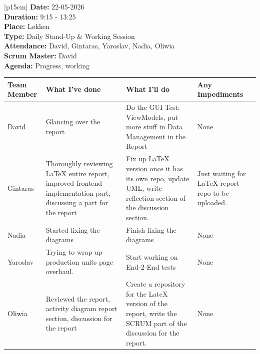 \begin{table}[H]
    \centering
    \begin{tabular}{|p{15cm}|}   
        \hline
        \textbf{Date:}  22-05-2026 \\
        \textbf{Duration:}  9:15 - 13:25 \\
        \textbf{Place:}  Løkken \\
        \textbf{Type:} Daily Stand-Up \& Working Session \\
        \textbf{Attendance:} David, Gintaras, Yaroslav, Nadia, Oliwia \\
        \textbf{Scrum Master:}  David \\
        \textbf{Agenda:} Progress, working
        \begin{table}[H]
            \begin{tabular}{|p{1.75cm}|p{4cm}|p{4cm}|p{4cm}|}
                \hline
                \cellcolor[HTML]{BFBFBF}  \textbf{Team Member} & \cellcolor[HTML]{BFBFBF}  \textbf{What I've done} & \cellcolor[HTML]{BFBFBF}  \textbf{What I'll do} & \cellcolor[HTML]{BFBFBF}  \textbf{Any Impediments}\\
                \hline
                \cellcolor[HTML]{d4d4d4} David & Glancing over the report & Do the GUI Test: ViewModels, put more stuff in Data Management in the Report & None \\
                \hline
                \cellcolor[HTML]{d4d4d4} Gintaras & Thoroughly reviewing LaTeX entire report, improved frontend implementation part, discussing a part for the report & Fix up LaTeX version once it has its own repo, update UML, write reflection section of the discussion section. & Just waiting for LaTeX report repo to be uploaded. \\
                \hline
                \cellcolor[HTML]{d4d4d4} Nadia & Started fixing the diagrams & Finish fixing the diagrams  & None \\
                \hline
                \cellcolor[HTML]{d4d4d4} Yaroslav & Trying to wrap up production units page overhaul. & Start working on End-2-End tests & None \\
                \hline
                \cellcolor[HTML]{d4d4d4} Oliwia & Reviewed the report, activity diagram report section, discussion for the report  & Create a repository for the LateX version of the report, write the SCRUM part of the discussion for the report. & None \\
                \hline
            \end{tabular}
        \end{table} \\
        \hline
    \end{tabular}
\end{table}

